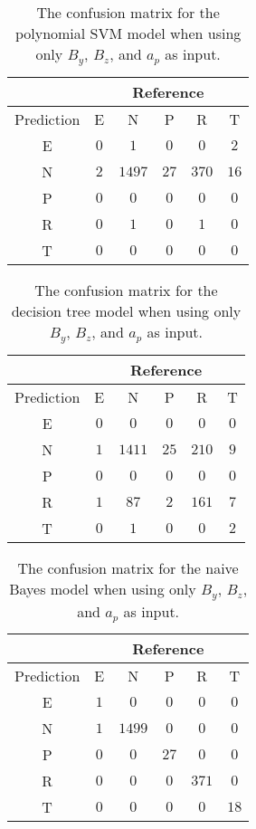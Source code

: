 \begin{table}[!ht]
	\centering
	\begin{tabular}{|c|c|c|c|c|c|}
		\hline
		 & \multicolumn{5}{|c|}{Reference} \\ \hline
		 Prediction & E & N & P & R & T \\ \hline
		 E & $0$ & $1$ & $0$ & $0$ & $2$ \\ \hline
		 N & $2$ & $1497$ & $27$ & $370$ & $16$ \\ \hline
		 P & $0$ & $0$ & $0$ & $0$ & $0$ \\ \hline
		 R & $0$ & $1$ & $0$ & $1$ & $0$ \\ \hline
		 T & $0$ & $0$ & $0$ & $0$ & $0$ \\ \hline
	\end{tabular}
	\caption{The confusion matrix for the polynomial SVM model when using only $B_{y}$, $B_{z}$, and $a_{p}$ as input.}
	\label{tab:cm:yzap:svmPoly}
\end{table}

\begin{table}[!ht]
	\centering
	\begin{tabular}{|c|c|c|c|c|c|}
		\hline
		 & \multicolumn{5}{|c|}{Reference} \\ \hline
		 Prediction & E & N & P & R & T \\ \hline
		 E & $0$ & $0$ & $0$ & $0$ & $0$ \\ \hline
		 N & $1$ & $1411$ & $25$ & $210$ & $9$ \\ \hline
		 P & $0$ & $0$ & $0$ & $0$ & $0$ \\ \hline
		 R & $1$ & $87$ & $2$ & $161$ & $7$ \\ \hline
		 T & $0$ & $1$ & $0$ & $0$ & $2$ \\ \hline
	\end{tabular}
	\caption{The confusion matrix for the decision tree model when using only $B_{y}$, $B_{z}$, and $a_{p}$ as input.}
	\label{tab:cm:yzap:C5.0}
\end{table}

\begin{table}[!ht]
	\centering
	\begin{tabular}{|c|c|c|c|c|c|}
		\hline
		 & \multicolumn{5}{|c|}{Reference} \\ \hline
		 Prediction & E & N & P & R & T \\ \hline
		 E & $1$ & $0$ & $0$ & $0$ & $0$ \\ \hline
		 N & $1$ & $1499$ & $0$ & $0$ & $0$ \\ \hline
		 P & $0$ & $0$ & $27$ & $0$ & $0$ \\ \hline
		 R & $0$ & $0$ & $0$ & $371$ & $0$ \\ \hline
		 T & $0$ & $0$ & $0$ & $0$ & $18$ \\ \hline
	\end{tabular}
	\caption{The confusion matrix for the naive Bayes model when using only $B_{y}$, $B_{z}$, and $a_{p}$ as input.}
	\label{tab:cm:yzap:nb}
\end{table}

